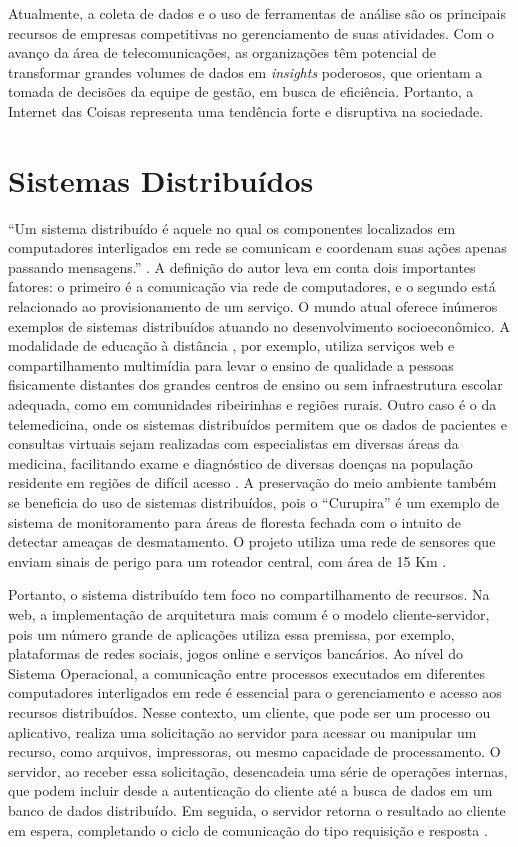 Atualmente, a coleta de dados e o uso de ferramentas de análise são os principais recursos de empresas competitivas no gerenciamento de suas atividades. Com o 
avanço da área de telecomunicações, as organizações têm potencial de transformar grandes volumes de dados em \textit{insights} poderosos, que orientam a tomada de 
decisões da equipe de gestão, em busca de eficiência. Portanto, a Internet das Coisas representa uma tendência forte e disruptiva na sociedade.

\section{Sistemas Distribuídos}

``Um sistema distribuído é aquele no qual os componentes localizados em computadores interligados em rede se comunicam e coordenam suas ações apenas passando mensagens.'' \cite[pp. 1]{sistemas-distribuidos-coulouris2013}.
A definição do autor leva em conta dois importantes fatores: o primeiro é a comunicação via rede de computadores, e o segundo está relacionado ao provisionamento de um serviço.
O mundo atual oferece inúmeros exemplos de sistemas distribuídos atuando no desenvolvimento socioeconômico. A modalidade de educação à distância \cite{mec-ead}, por exemplo, utiliza serviços 
web e compartilhamento multimídia para levar o ensino de qualidade a pessoas fisicamente distantes dos grandes centros de ensino ou sem infraestrutura escolar adequada, como em comunidades 
ribeirinhas e regiões rurais. Outro caso é o da telemedicina, onde os sistemas distribuídos permitem que os dados de pacientes e consultas virtuais sejam realizadas com 
especialistas em diversas áreas da medicina, facilitando exame e diagnóstico de diversas doenças na população residente em regiões de difícil acesso \cite{telemedicina}. A preservação do meio ambiente 
também se beneficia do uso de sistemas distribuídos, pois o ``Curupira'' é um exemplo de sistema de monitoramento para áreas de floresta fechada com o intuito de detectar ameaças de desmatamento. O projeto utiliza 
uma rede de sensores que enviam sinais de perigo para um roteador central, com área de 15 Km \cite{curupira}.

Portanto, o sistema distribuído tem foco no compartilhamento de recursos. Na web, a implementação de arquitetura mais comum é o modelo cliente-servidor, pois
um número grande de aplicações utiliza essa premissa, por exemplo, plataformas de redes sociais, jogos online e serviços bancários.
Ao nível do Sistema Operacional, a comunicação entre processos executados em diferentes computadores interligados em rede é essencial para o gerenciamento e acesso aos recursos distribuídos.
Nesse contexto, um cliente, que pode ser um processo ou aplicativo, realiza uma solicitação ao servidor para acessar ou manipular um recurso, como arquivos, impressoras, ou mesmo capacidade de processamento. O servidor, 
ao receber essa solicitação, desencadeia uma série de operações internas, que podem incluir desde a autenticação do cliente até a busca de dados em um banco de dados distribuído. Em seguida, o servidor 
retorna o resultado ao cliente em espera, completando o ciclo de comunicação do tipo requisição e resposta \cite[pp. 16]{sistemas-distribuidos-coulouris2013}.

